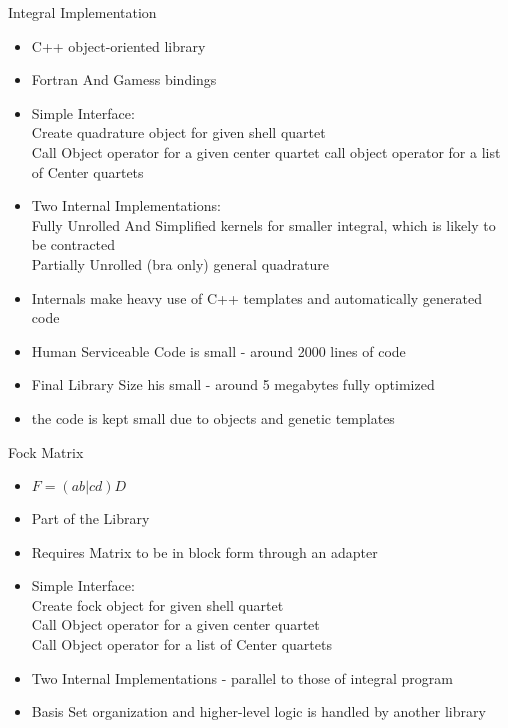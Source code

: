 \documentclass{beamer}
\begin{document}
\begin{frame}{  Integral Implementation}
\begin{itemize}
\item C++ object-oriented library
\item Fortran And Gamess bindings
\item  Simple Interface:\\
Create quadrature object for given shell quartet\\
Call Object operator for a given center quartet
call object operator for a list of Center quartets

\item Two Internal Implementations:\\
  Fully Unrolled And Simplified kernels for smaller  integral, 
  which is likely to be contracted\\
  Partially Unrolled (bra only) general quadrature\\
\item Internals make heavy use of  C++ templates and automatically generated code
\item Human Serviceable Code is small - around 2000 lines of code
\item Final Library Size his small - around 5 megabytes fully optimized
\item the code is kept small due to objects and genetic templates
\end{itemize}
\end{frame}

\begin{frame}{  Fock Matrix}
\begin{itemize}
\item $F = (ab |cd)D $
\item Part of the Library
\item Requires Matrix to be in block form through an adapter
\item Simple Interface:\\
Create fock object for given shell quartet\\
Call Object operator for a given center quartet\\
Call Object operator for a list of Center quartets
\item Two Internal Implementations - parallel to those of integral program
\item Basis Set organization and higher-level logic is handled by another library
\end{itemize}
\end{frame}
\end{document}
